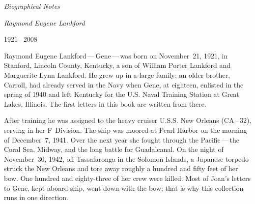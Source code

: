 
\cleardoublepage
\thispagestyle{laempty}
\vspace*{0.12\textheight}
\begin{center}
    \par
    \vspace{0.4em}
    \brassrule[36pt]\par
    \vspace{1.6em}
    {\Huge\displayfont\itshape Biographical Notes\par}
\end{center}
\vfill
\cleardoublepage

\thispagestyle{laplain}
\vspace*{0.06\textheight}
\begin{center}
    {\Large\displayfont\itshape Raymond Eugene Lankford\par}
    {\monofont\small{}\color{walnutmute}1921\,--\,2008}
\end{center}
\vspace{1.4em}

\noindent
Raymond Eugene Lankford\,---\,Gene\,---\,was born on November~21, 1921, in
Stanford, Lincoln County, Kentucky, a son of William Porter Lankford and
Marguerite Lynn Lankford. He grew up in a large family; an older brother,
Carroll, had already served in the Navy when Gene, at eighteen, enlisted in
the spring of 1940 and left Kentucky for the U.S. Naval Training Station at
Great Lakes, Illinois. The first letters in this book are written from there.

\par
After training he was assigned to the heavy cruiser U.S.S. New Orleans
(CA\,--\,32), serving in her F~Division. The ship was moored at Pearl Harbor
on the morning of December~7, 1941. Over the next year she fought through the
Pacific\,---\,the Coral Sea, Midway, and the long battle for Guadalcanal. On
the night of November~30, 1942, off Tassafaronga in the Solomon Islands, a
Japanese torpedo struck the New Orleans and tore away roughly a hundred and
fifty feet of her bow. One hundred and eighty-three of her crew were killed.
Most of Joan's letters to Gene, kept aboard ship, went down with the bow; that
is why this collection runs in one direction.

